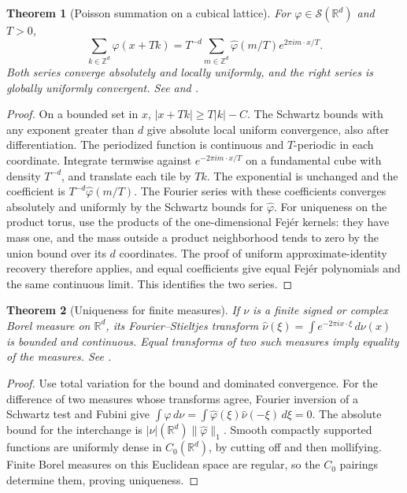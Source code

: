 \documentclass[11pt,oneside,openany]{book}
\newtheorem{theorem}{Theorem}[chapter]
\theoremstyle{definition}
\theoremstyle{remark}
\begin{document}
\begin{theorem}[Poisson summation on a cubical lattice]
\label{p102:U3-01}
For \(\varphi\in\mathcal S(\mathbb R^d)\) and \(T>0\),
\[
 \sum_{k\in\mathbb Z^d}\varphi(x+Tk)
 =T^{-d}\sum_{m\in\mathbb Z^d}\widehat\varphi(m/T)e^{2\pi i m\cdot x/T}.
\]
Both series converge absolutely and locally uniformly, and the right series is globally uniformly convergent. See \cite[Chapter 5, \S3]{stein-shakarchi} and \cite[\S7.2]{hormander}.
\end{theorem}
\begin{proof}
On a bounded set in \(x\), \(|x+Tk|\ge T|k|-C\). The Schwartz bounds with any exponent greater than \(d\) give absolute local uniform convergence, also after differentiation. The periodized function is continuous and \(T\)-periodic in each coordinate. Integrate termwise against \(e^{-2\pi i m\cdot x/T}\) on a fundamental cube with density \(T^{-d}\), and translate each tile by \(Tk\). The exponential is unchanged and the coefficient is \(T^{-d}\widehat\varphi(m/T)\). The Fourier series with these coefficients converges absolutely and uniformly by the Schwartz bounds for \(\widehat\varphi\). For uniqueness on the product torus, use the products of the one-dimensional Fej\'er kernels: they have mass one, and the mass outside a product neighborhood tends to zero by the union bound over its \(d\) coordinates. The proof of uniform approximate-identity recovery therefore applies, and equal coefficients give equal Fej\'er polynomials and the same continuous limit. This identifies the two series.
\end{proof}

\begin{theorem}[Uniqueness for finite measures]
\label{p102:U3-02}
If \(\nu\) is a finite signed or complex Borel measure on \(\mathbb R^d\), its Fourier--Stieltjes transform
\(\widehat\nu(\xi)=\int e^{-2\pi i x\cdot\xi}\,d\nu(x)\) is bounded and continuous. Equal transforms of two such measures imply equality of the measures. See \cite[\S8.6]{folland}.
\end{theorem}
\begin{proof}
Use total variation for the bound and dominated convergence. For the difference of two measures whose transforms agree, Fourier inversion of a Schwartz test and Fubini give \(\int\varphi\,d\nu=\int \widehat\varphi(\xi)\widehat\nu(-\xi)\,d\xi=0\). The absolute bound for the interchange is \(|\nu|(\mathbb R^d)\|\widehat\varphi\|_1\). Smooth compactly supported functions are uniformly dense in \(C_0(\mathbb R^d)\), by cutting off and then mollifying. Finite Borel measures on this Euclidean space are regular, so the \(C_0\) pairings determine them, proving uniqueness.
\end{proof}
\end{document}
